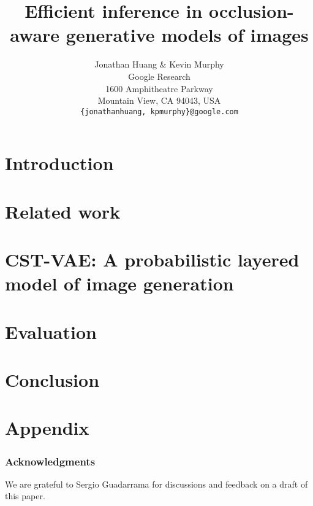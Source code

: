 \documentclass{article} %
\title{Efficient inference in occlusion-aware generative models of images}
\author{Jonathan Huang \& Kevin Murphy \\
Google Research \\
1600 Amphitheatre Parkway \\
Mountain View, CA 94043, USA\\
\texttt{\{jonathanhuang, kpmurphy\}@google.com}
}
\begin{document}
\maketitle



\section{Introduction}


\section{Related work}


\section{CST-VAE: A probabilistic layered model of image generation}


\section{Evaluation}


\section{Conclusion}


\section*{Appendix}


\subsubsection*{Acknowledgments}
We are grateful to Sergio Guadarrama for discussions and feedback on 
a draft of this paper.



\end{document}
